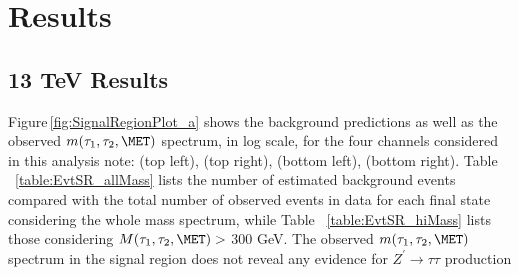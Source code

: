 \chapter{Results}\label{sec:results}

\section{13 TeV Results}

Figure\,\ref{fig:SignalRegionPlot_a} shows the background predictions as well as the observed $m(\tau_{1},\tau_{2},\MET)$ spectrum, in log scale, for the four 
channels considered in this analysis note: \mutau (top left), \ditauhad (top right), \etau (bottom left), \emu (bottom right). 
Table ~\ref{table:EvtSR_allMass} lists the number of estimated background events compared with the total number of observed events in data for each final state
considering the whole mass spectrum, while Table ~\ref{table:EvtSR_hiMass} lists those considering $M(\tau_1,\tau_2,\MET) >$ 300 GeV.
The observed $m(\tau_{1},\tau_{2},\MET)$ spectrum in the signal region does not reveal any evidence for $Z^{\prime}\to\tau\tau$ production 
